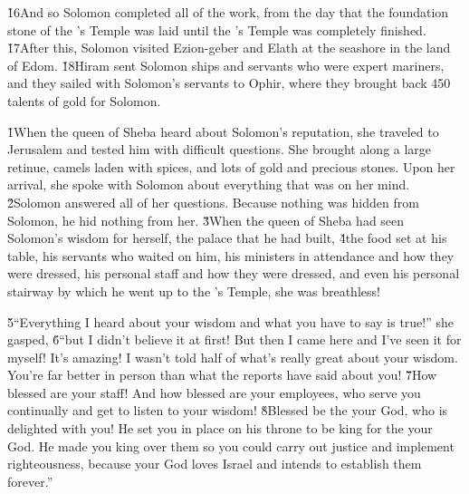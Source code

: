 \v{16}And so Solomon completed all of the work, from the day that the foundation stone of the 's Temple was laid until the 's Temple was completely finished. \v{17}After this, Solomon visited Ezion-geber and Elath at the seashore in the land of Edom. \v{18}Hiram sent Solomon ships and servants who were expert mariners, and they sailed with Solomon's servants to Ophir, where they brought back 450 talents of gold for Solomon.

\v{1}When the queen of Sheba heard about Solomon's reputation, she traveled to Jerusalem and tested him with difficult questions. She brought along a large retinue, camels laden with spices, and lots of gold and precious stones. Upon her arrival, she spoke with Solomon about everything that was on her mind. \v{2}Solomon answered all of her questions. Because nothing was hidden from Solomon, he hid nothing from her. \v{3}When the queen of Sheba had seen Solomon's wisdom for herself, the palace that he had built, \v{4}the food set at his table, his servants who waited on him, his ministers in attendance and how they were dressed, his personal staff and how they were dressed, and even his personal stairway by which he went up to the 's Temple, she was breathless!

\v{5}``Everything I heard about your wisdom and what you have to say is true!'' she gasped, \v{6}``but I didn't believe it at first! But then I came here and I've seen it for myself! It's amazing! I wasn't told half of what's really great about your wisdom. You're far better in person than what the reports have said about you! \v{7}How blessed are your staff! And how blessed are your employees, who serve you continually and get to listen to your wisdom! \v{8}Blessed be the  your God, who is delighted with you! He set you in place on his throne to be king for the  your God. He made you king over them so you could carry out justice and implement righteousness, because your God loves Israel and intends to establish them forever.''

